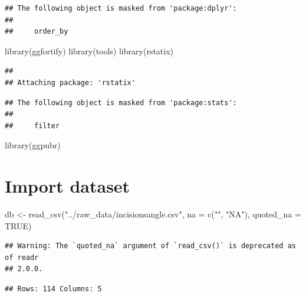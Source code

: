 \documentclass[
]{article}
\newenvironment{Shaded}{\begin{snugshade}}{\end{snugshade}}
\newcommand{\AttributeTok}[1]{\textcolor[rgb]{0.77,0.63,0.00}{#1}}
\newcommand{\ConstantTok}[1]{\textcolor[rgb]{0.00,0.00,0.00}{#1}}
\newcommand{\FunctionTok}[1]{\textcolor[rgb]{0.00,0.00,0.00}{#1}}
\newcommand{\NormalTok}[1]{#1}
\newcommand{\OtherTok}[1]{\textcolor[rgb]{0.56,0.35,0.01}{#1}}
\newcommand{\StringTok}[1]{\textcolor[rgb]{0.31,0.60,0.02}{#1}}
\begin{document}
\begin{verbatim}
## The following object is masked from 'package:dplyr':
## 
##     order_by
\end{verbatim}

\begin{Shaded}
\begin{Highlighting}[]
\FunctionTok{library}\NormalTok{(ggfortify)}
\FunctionTok{library}\NormalTok{(tools)}
\FunctionTok{library}\NormalTok{(rstatix)}
\end{Highlighting}
\end{Shaded}

\begin{verbatim}
## 
## Attaching package: 'rstatix'
\end{verbatim}

\begin{verbatim}
## The following object is masked from 'package:stats':
## 
##     filter
\end{verbatim}

\begin{Shaded}
\begin{Highlighting}[]
\FunctionTok{library}\NormalTok{(ggpubr)}
\end{Highlighting}
\end{Shaded}

\hypertarget{import-dataset}{%
\section{Import dataset}\label{import-dataset}}

\begin{Shaded}
\begin{Highlighting}[]
\NormalTok{db }\OtherTok{\textless{}{-}} \FunctionTok{read\_csv}\NormalTok{(}\StringTok{"../raw\_data/incisionsangle.csv"}\NormalTok{, }\AttributeTok{na =} \FunctionTok{c}\NormalTok{(}\StringTok{""}\NormalTok{, }\StringTok{"NA"}\NormalTok{), }\AttributeTok{quoted\_na =} \ConstantTok{TRUE}\NormalTok{)}
\end{Highlighting}
\end{Shaded}

\begin{verbatim}
## Warning: The `quoted_na` argument of `read_csv()` is deprecated as of readr
## 2.0.0.
\end{verbatim}

\begin{verbatim}
## Rows: 114 Columns: 5
\end{verbatim}
\end{document}
